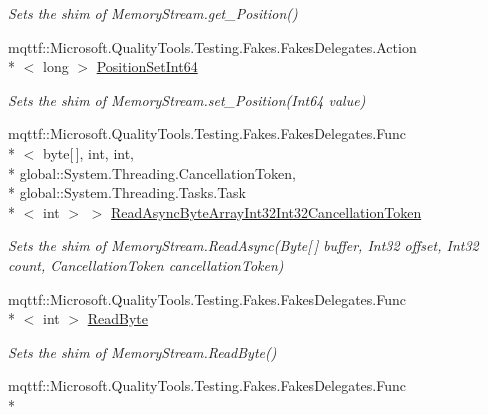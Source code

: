 \begin{DoxyCompactItemize}
\begin{DoxyCompactList}\small\item\em Sets the shim of Memory\-Stream.\-get\-\_\-\-Position()\end{DoxyCompactList}\item 
mqttf\-::\-Microsoft.\-Quality\-Tools.\-Testing.\-Fakes.\-Fakes\-Delegates.\-Action\\*
$<$ long $>$ \hyperlink{class_system_1_1_i_o_1_1_fakes_1_1_shim_memory_stream_a5877b05ff0205ee89c9a32edafeb6647}{Position\-Set\-Int64}
\begin{DoxyCompactList}\small\item\em Sets the shim of Memory\-Stream.\-set\-\_\-\-Position(\-Int64 value)\end{DoxyCompactList}\item 
mqttf\-::\-Microsoft.\-Quality\-Tools.\-Testing.\-Fakes.\-Fakes\-Delegates.\-Func\\*
$<$ byte\mbox{[}$\,$\mbox{]}, int, int, \\*
global\-::\-System.\-Threading.\-Cancellation\-Token, \\*
global\-::\-System.\-Threading.\-Tasks.\-Task\\*
$<$ int $>$ $>$ \hyperlink{class_system_1_1_i_o_1_1_fakes_1_1_shim_memory_stream_abf3788cbf51fa9012176a84002a72dcb}{Read\-Async\-Byte\-Array\-Int32\-Int32\-Cancellation\-Token}
\begin{DoxyCompactList}\small\item\em Sets the shim of Memory\-Stream.\-Read\-Async(\-Byte\mbox{[}$\,$\mbox{]} buffer, Int32 offset, Int32 count, Cancellation\-Token cancellation\-Token)\end{DoxyCompactList}\item 
mqttf\-::\-Microsoft.\-Quality\-Tools.\-Testing.\-Fakes.\-Fakes\-Delegates.\-Func\\*
$<$ int $>$ \hyperlink{class_system_1_1_i_o_1_1_fakes_1_1_shim_memory_stream_aa0f547f9ec94732c81a214c9e177e1f7}{Read\-Byte}
\begin{DoxyCompactList}\small\item\em Sets the shim of Memory\-Stream.\-Read\-Byte()\end{DoxyCompactList}\item 
mqttf\-::\-Microsoft.\-Quality\-Tools.\-Testing.\-Fakes.\-Fakes\-Delegates.\-Func\\*

\end{DoxyCompactItemize}
